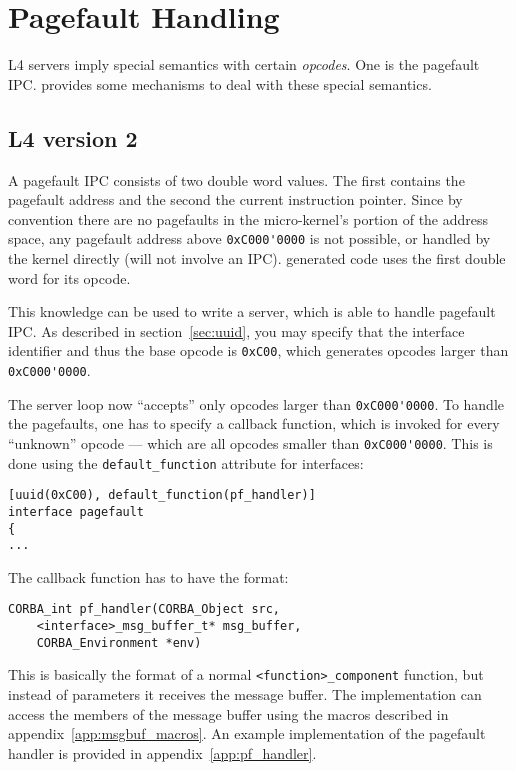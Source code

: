 \chapter{Pagefault Handling}
\label{app:pagefault-handling}

L4 servers imply special semantics with certain {\em opcodes}. One is the pagefault
IPC. \dice{} provides some mechanisms to deal with these special semantics.

\section{L4 version 2}
A pagefault IPC consists of two double word values. The first contains the
pagefault address and the second the current instruction pointer. Since by 
convention there are no pagefaults in the micro-kernel's portion of the 
address space, any pagefault address above \verb|0xC000'0000| is not possible,
or handled by the kernel directly (will not involve an IPC). \dice{} generated 
code uses the first double word for its opcode.

This knowledge can be used to write a server, which is able to handle 
pagefault IPC. As described in section~\ref{sec:uuid}, you may specify that
the interface identifier and thus the base opcode is \verb|0xC00|, which
generates opcodes larger than \verb|0xC000'0000|.

The server loop now ``accepts'' only opcodes larger than \verb|0xC000'0000|.
To handle the pagefaults, one has to specify a callback function, which is
invoked for every ``unknown'' opcode --- which are all opcodes smaller
than \verb|0xC000'0000|. This is done using the \verb|default_function|
attribute for interfaces:

\begin{verbatim}
[uuid(0xC00), default_function(pf_handler)]
interface pagefault
{
...
\end{verbatim}

The callback function has to have the format:

\begin{verbatim}
CORBA_int pf_handler(CORBA_Object src,
    <interface>_msg_buffer_t* msg_buffer,
    CORBA_Environment *env)
\end{verbatim}

This is basically the format of a normal \verb|<function>_component|
function, but instead of parameters it receives the message buffer.
The implementation can access the members of the message buffer using
the macros described in appendix~\ref{app:msgbuf_macros}. An example
implementation of the pagefault handler is provided in 
appendix~\ref{app:pf_handler}.

